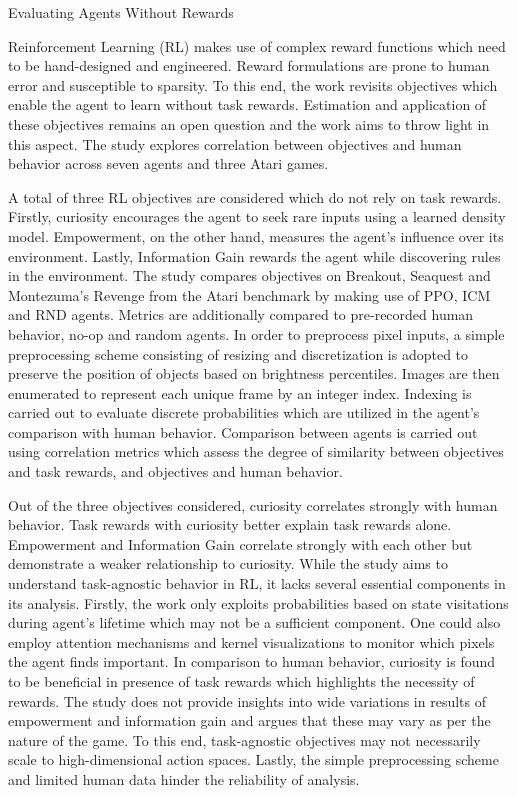 \documentclass[11pt,letterpaper]{article}
\begin{document}
\begin{center}
  \large{Evaluating Agents Without Rewards}
\end{center}

Reinforcement Learning (RL) makes use of complex reward functions which need to be hand-designed and engineered. Reward formulations are prone to human error and susceptible to sparsity. To this end, the work revisits objectives which enable the agent to learn without task rewards. Estimation and application of these objectives remains an open question and the work aims to throw light in this aspect. The study explores correlation between objectives and human behavior across seven agents and three Atari games.

A total of three RL objectives are considered which do not rely on task rewards. Firstly, curiosity encourages the agent to seek rare inputs using a learned density model. Empowerment, on the other hand, measures the agent's influence over its environment. Lastly, Information Gain rewards the agent while discovering rules in the environment. The study compares objectives on Breakout, Seaquest and Montezuma's Revenge from the Atari benchmark by making use of PPO, ICM and RND agents. Metrics are additionally compared to pre-recorded human behavior, no-op and random agents. In order to preprocess pixel inputs, a simple preprocessing scheme consisting of resizing and discretization is adopted to preserve the position of objects based on brightness percentiles. Images are then enumerated to represent each unique frame by an integer index. Indexing is carried out to evaluate discrete probabilities which are utilized in the agent's comparison with human behavior. Comparison between agents is carried out using correlation metrics which assess the degree of similarity between objectives and task rewards, and objectives and human behavior. 

Out of the three objectives considered, curiosity correlates strongly with human behavior. Task rewards with curiosity better explain task rewards alone. Empowerment and Information Gain correlate strongly with each other but demonstrate a weaker relationship to curiosity. While the study aims to understand task-agnostic behavior in RL, it lacks several essential components in its analysis. Firstly, the work only exploits probabilities based on state visitations during agent's lifetime which may not be a sufficient component. One could also employ attention mechanisms and kernel visualizations to monitor which pixels the agent finds important. In comparison to human behavior, curiosity is found to be beneficial in presence of task rewards which highlights the necessity of rewards. The study does not provide insights into wide variations in results of empowerment and information gain and argues that these may vary as per the nature of the game. To this end, task-agnostic objectives may not necessarily scale to high-dimensional action spaces. Lastly, the simple preprocessing scheme and limited human data hinder the reliability of analysis. 
\end{document}
